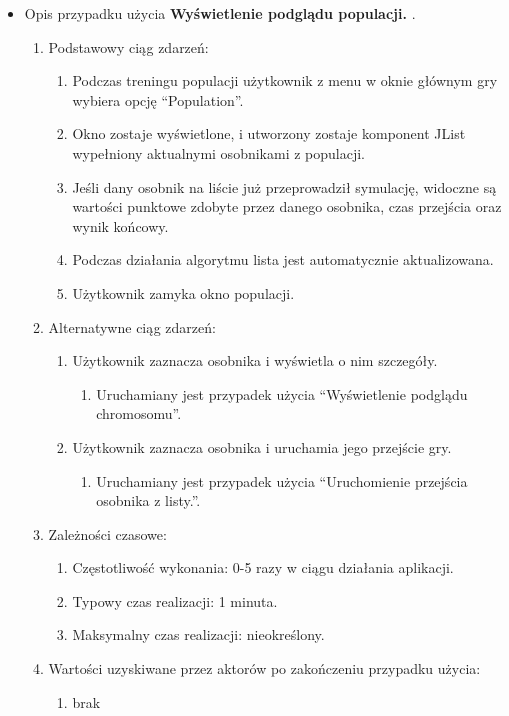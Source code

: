\begin{par}
\begin{itemize}
	\item
	Opis przypadku użycia {\bf Wyświetlenie podglądu populacji. }.
	\begin{enumerate}
	\item Podstawowy ciąg zdarzeń:
		\begin{enumerate}
		\item Podczas treningu populacji użytkownik z menu w oknie głównym gry wybiera opcję ``Population''.
		\item Okno zostaje wyświetlone, i utworzony zostaje komponent JList wypełniony aktualnymi osobnikami z populacji.
		\item Jeśli dany osobnik na liście już przeprowadził symulację, widoczne są wartości punktowe zdobyte przez danego osobnika, czas przejścia oraz wynik końcowy.
		\item Podczas działania algorytmu lista jest automatycznie aktualizowana.
		\item Użytkownik zamyka okno populacji.
		\end{enumerate}
	\item Alternatywne ciąg zdarzeń:
		\begin{enumerate}
		\item Użytkownik zaznacza osobnika i wyświetla o nim szczegóły.
		\begin{enumerate}
			\item Uruchamiany jest przypadek użycia ``Wyświetlenie podglądu chromosomu''.
		\end{enumerate}
		\item Użytkownik zaznacza osobnika i uruchamia jego przejście gry.
		\begin{enumerate}
			\item Uruchamiany jest przypadek użycia ``Uruchomienie przejścia osobnika z listy.''.
		\end{enumerate}
		\end{enumerate}
	\item Zależności czasowe:
		\begin{enumerate}
		\item Częstotliwość wykonania: 0-5 razy w ciągu działania aplikacji.
		\item Typowy czas realizacji: 1 minuta.
		\item Maksymalny czas realizacji: nieokreślony.
		\end{enumerate}
	\item Wartości uzyskiwane przez aktorów po zakończeniu przypadku użycia:
		\begin{enumerate}
		\item brak

\end{enumerate}
\end{enumerate}
\end{itemize}
\end{par}
